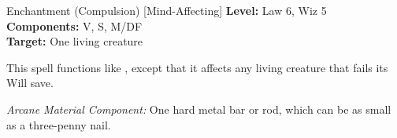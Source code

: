{Enchantment (Compulsion) [Mind-Affecting]}
{
	\textbf{Level:}
	Law 6, Wiz 5\\
	\textbf{Components:}
	V, S, M/DF\\
	\textbf{Target:}
	One living creature\\
}
{
	This spell functions like , except that it affects any living creature that fails its Will save.

	\textit{Arcane Material Component:}
	One hard metal bar or rod, which can be as small as a three-penny nail.

}
